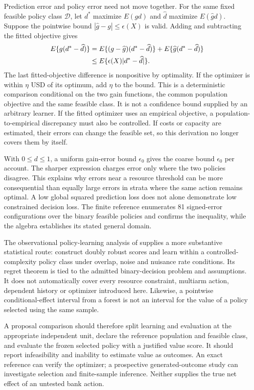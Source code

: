 Prediction error and policy error need not move together. For the same fixed
feasible policy class $\mathcal D$, let $d^*$ maximize $E(gd)$ and
$\widehat d$ maximize $E(\widehat g d)$. Suppose the pointwise bound
$|\widehat g-g|\leq\epsilon(X)$ is valid. Adding and subtracting the fitted
objective gives
\begin{align}
 E\{g(d^*-\widehat d)\}
 &=E\{(g-\widehat g)(d^*-\widehat d)\}
       +E\{\widehat g(d^*-\widehat d)\}\notag\\
 &\leq E\{\epsilon(X)|d^*-\widehat d|\}.
 \label{exec17:s4-regret-bound}
\end{align}
The last fitted-objective difference is nonpositive by optimality. If the
optimizer is within $\eta$ USD of its optimum, add $\eta$ to the bound.
This is a deterministic comparison conditional on the two gain functions,
the common population objective and the same feasible class. It is not a
confidence bound supplied by an arbitrary learner. If the fitted optimizer
uses an empirical objective, a population-to-empirical discrepancy must also
be controlled. If costs or capacity are estimated, their errors can change
the feasible set, so this derivation no longer covers them by itself.

With $0\leq d\leq1$, a uniform gain-error bound $\epsilon_0$ gives the coarse
bound $\epsilon_0$ per account. The sharper expression charges error only
where the two policies disagree. This explains why errors near a resource
threshold can be more consequential than equally large errors in strata
where the same action remains optimal. A low global squared prediction loss
does not alone demonstrate low constrained decision loss. The finite
reference enumerates 81 signed-error configurations over the binary feasible
policies and confirms the inequality, while the algebra establishes its stated
general domain.~\citep{exec17_s4_math}

The observational policy-learning analysis of \citet{policy2021} supplies a
more substantive statistical route: construct doubly robust scores and learn
within a controlled-complexity policy class under overlap, noise and nuisance
rate conditions. Its regret theorem is tied to the admitted binary-decision
problem and assumptions. It does not automatically cover every resource
constraint, multiarm action, dependent history or optimizer introduced here.
Likewise, a pointwise conditional-effect interval from a forest is not an
interval for the value of a policy selected using the same sample.

A proposal comparison should therefore split learning and evaluation at the
appropriate independent unit, declare the reference population and feasible
class, and evaluate the frozen selected policy with a justified value score.
It should report infeasibility and inability to estimate value as outcomes.
An exact reference can verify the optimizer; a prospective generated-outcome
study can investigate selection and finite-sample inference. Neither supplies
the true net effect of an untested bank action.

